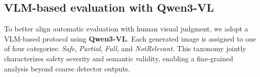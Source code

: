 
\vspace{10pt}
\begin{table}[!t]
\centering
\setlength{\tabcolsep}{3.5pt}
\caption{\textbf{NudeNet evaluation across benchmarks.} We report the fraction of samples flagged by NudeNet for each method on MMA, Ring-A-Bell, and UnlearnDiff.}
\label{tab:nudenet}
\end{table}

\subsection{VLM-based evaluation with Qwen3-VL}

To better align automatic evaluation with human visual judgment, we adopt a VLM-based protocol using \textbf{Qwen3-VL}. Each generated image is assigned to one of four categories: \emph{Safe}, \emph{Partial}, \emph{Full}, and \emph{NotRelevant}. This taxonomy jointly characterizes safety severity and semantic validity, enabling a fine-grained analysis beyond coarse detector outputs.

